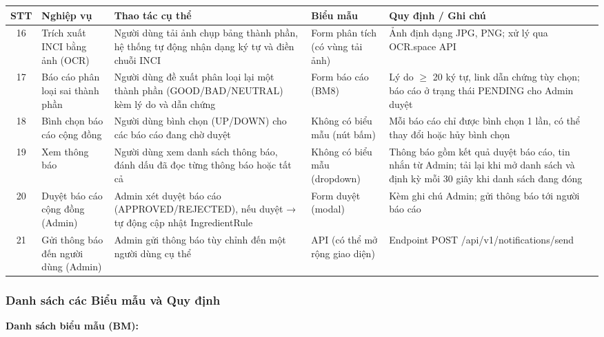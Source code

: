 \documentclass[12pt,a4paper]{article}
\begin{document}
\begin{center}
\begin{tabular}{|c|p{3cm}|p{5cm}|p{2.5cm}|p{3cm}|}
\hline
\textbf{STT} & \textbf{Nghiệp vụ} & \textbf{Thao tác cụ thể} & \textbf{Biểu mẫu} & \textbf{Quy định / Ghi chú} \\
\hline
16 & Trích xuất INCI bằng ảnh (OCR) 
& Người dùng tải ảnh chụp bảng thành phần, hệ thống tự động nhận dạng ký tự và điền chuỗi INCI 
& Form phân tích (có vùng tải ảnh) 
& Ảnh định dạng JPG, PNG; xử lý qua OCR.space API \\
\hline
17 & Báo cáo phân loại sai thành phần 
& Người dùng đề xuất phân loại lại một thành phần (GOOD/BAD/NEUTRAL) kèm lý do và dẫn chứng 
& Form báo cáo (BM8) 
& Lý do $\ge$ 20 ký tự, link dẫn chứng tùy chọn; báo cáo ở trạng thái PENDING cho Admin duyệt \\
\hline
18 & Bình chọn báo cáo cộng đồng 
& Người dùng bình chọn (UP/DOWN) cho các báo cáo đang chờ duyệt 
& Không có biểu mẫu (nút bấm) 
& Mỗi báo cáo chỉ được bình chọn 1 lần, có thể thay đổi hoặc hủy bình chọn \\
\hline
19 & Xem thông báo 
& Người dùng xem danh sách thông báo, đánh dấu đã đọc từng thông báo hoặc tất cả 
& Không có biểu mẫu (dropdown) 
& Thông báo gồm kết quả duyệt báo cáo, tin nhắn từ Admin; tải lại khi mở danh sách và định kỳ mỗi 30 giây khi danh sách đang đóng \\
\hline
20 & Duyệt báo cáo cộng đồng (Admin) 
& Admin xét duyệt báo cáo (APPROVED/REJECTED), nếu duyệt → tự động cập nhật IngredientRule 
& Form duyệt (modal) 
& Kèm ghi chú Admin; gửi thông báo tới người báo cáo \\
\hline
21 & Gửi thông báo đến người dùng (Admin) 
& Admin gửi thông báo tùy chỉnh đến một người dùng cụ thể 
& API (có thể mở rộng giao diện) 
& Endpoint POST /api/v1/notifications/send \\
\hline


\end{tabular}
\end{center}

\subsubsection{Danh sách các Biểu mẫu và Quy định}

\textbf{Danh sách biểu mẫu (BM):}
\end{document}
